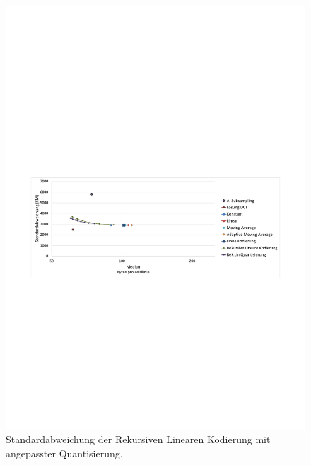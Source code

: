 \begin{figure}[!htbp]
	\center
	\includegraphics[trim = 1.8cm 11cm 1.8cm 12.5cm, clip=true,width=1\textwidth,keepaspectratio]{./pictures/resultate/loesung2/variante3/resultate.pdf}
		\caption{Standardabweichung der Rekursiven Linearen Kodierung mit angepasster Quantisierung.}
		\label{resultate:loesung2:adaptive:median:quant}
\end{figure}
